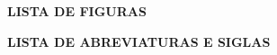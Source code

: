 \documentclass[12pt,a4paper,oneside]{report}
\begin{document}
\renewcommand{\cftlottitlefont}{}
\renewcommand{\listtablename}{}
\setlength{\cftbeforelottitleskip}{-\baselineskip}
\setlength{\cftafterlottitleskip}{0pt}

\renewcommand{\cfttabpresnum}{\bfseries{Tabela~}}
\renewcommand{\cfttabaftersnum}{~-~}
\setlength{\cfttabnumwidth}{4.75em}
\renewcommand{\cfttabdotsep}{\cftdotsep}
\vspace{0.5cm}
{\def\addvspace#1{}\listoftables}

\newpage

\begin{center}
    \normalsize\bfseries{LISTA DE FIGURAS}
\end{center}

\renewcommand{\cftloftitlefont}{}
\renewcommand{\listfigurename}{}
\setlength{\cftbeforeloftitleskip}{-\baselineskip}
\setlength{\cftafterloftitleskip}{0pt}

\renewcommand{\cftfigpresnum}{\bfseries{Figura~}}
\renewcommand{\cftfigaftersnum}{~-~}
\setlength{\cftfignumwidth}{4.5em}
\renewcommand{\cftfigdotsep}{\cftdotsep}
\vspace{0.5cm}
{\def\addvspace#1{}\listoffigures}


\newpage

\begin{center}
    \normalsize\bfseries{LISTA DE ABREVIATURAS E SIGLAS}
\end{center}
\end{document}
